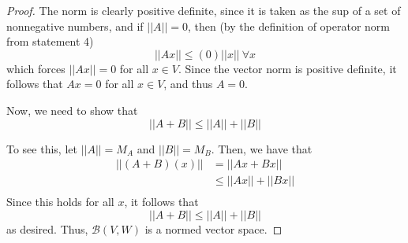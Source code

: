 \documentclass[fontsize=11pt]{scrartcl} %
\numberwithin{equation}{section} %
\numberwithin{figure}{section} %
\numberwithin{table}{section} %
\begin{document}
\begin{proof}
    The norm is clearly positive definite, since it is taken as the sup of a set
    of nonnegative numbers, and if $||A||=0$, then (by the
    definition of operator norm from statement 4)
    \[
        ||Ax||\leq (0)||x||\ \forall x
    \]
    which forces $||Ax||=0$ for all $x\in V$. Since the vector norm is positive
    definite, it follows that $Ax=0$ for all $x\in V$, and thus $A=0$.

    Now, we need to show that
    \[
        ||A+B|| \leq ||A||+||B||
    \]

    To see this, let $||A||=M_A$ and $||B||=M_B$. Then, we have that
    \[
        \begin{aligned}
            ||(A+B)(x)|| &= ||Ax+Bx||\\
                        &\leq ||Ax||+||Bx||\\
        \end{aligned}
    \]
    Since this holds for all $x$, it follows that
    \[
        ||A+B||\leq ||A||+||B||
    \]
    as desired. Thus, $\mathscr{B}(V,W)$ is a normed vector space.
\end{proof}

\newpage
\end{document}
